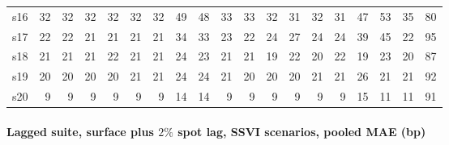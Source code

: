 {\begin{tabular}{l rrrrrrrrrrrrrrrrrr}
s16 & 32 & 32 & 32 & 32 & 32 & 32 & 49 & 48 & 33 & 33 & 32 & 31 & 32 & 31 & 47 & 53 & 35 & 80\\
s17 & 22 & 22 & 21 & 21 & 21 & 21 & 34 & 33 & 23 & 22 & 24 & 27 & 24 & 24 & 39 & 45 & 22 & 95\\
s18 & 21 & 21 & 21 & 22 & 21 & 21 & 24 & 23 & 21 & 21 & 19 & 22 & 20 & 22 & 19 & 23 & 20 & 87\\
s19 & 20 & 20 & 20 & 20 & 21 & 21 & 24 & 24 & 21 & 20 & 20 & 20 & 21 & 21 & 26 & 21 & 21 & 92\\
s20 & 9 & 9 & 9 & 9 & 9 & 9 & 14 & 14 & 9 & 9 & 9 & 9 & 9 & 9 & 15 & 11 & 11 & 91\\
\bottomrule
\end{tabular}}

\paragraph{Lagged suite, surface plus $2\%$ spot lag, SSVI scenarios, pooled MAE (bp)}\mbox{}

